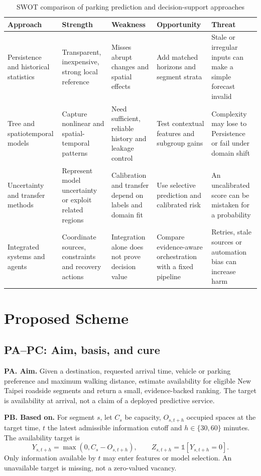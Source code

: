 \documentclass[conference,letterpaper,10pt]{IEEEtran}
\begin{document}
\begin{table}[t]
\caption{SWOT comparison of parking prediction and decision-support approaches}
\label{tab:swot}
\centering
\scriptsize
\renewcommand{\arraystretch}{1.12}
\begin{tabular}{p{}p{}p{}p{}p{}}
\toprule
Approach & Strength & Weakness & Opportunity & Threat \\
\midrule
Persistence and historical statistics & Transparent, inexpensive, strong local reference & Misses abrupt changes and spatial effects & Add matched horizons and segment strata & Stale or irregular inputs can make a simple forecast invalid \\
Tree and spatiotemporal models & Capture nonlinear and spatial-temporal patterns & Need sufficient, reliable history and leakage control & Test contextual features and subgroup gains & Complexity may lose to Persistence or fail under domain shift \\
Uncertainty and transfer methods & Represent model uncertainty or exploit related regions & Calibration and transfer depend on labels and domain fit & Use selective prediction and calibrated risk & An uncalibrated score can be mistaken for a probability \\
Integrated systems and agents & Coordinate sources, constraints and recovery actions & Integration alone does not prove decision value & Compare evidence-aware orchestration with a fixed pipeline & Retries, stale sources or automation bias can increase harm \\
\bottomrule
\end{tabular}
\end{table}

\section{Proposed Scheme}
\subsection{PA--PC: Aim, basis, and cure}
\noindent\textbf{PA. Aim.} Given a destination, requested arrival time, vehicle or parking preference and maximum walking distance, estimate availability for eligible New Taipei roadside segments and return a small, evidence-backed ranking. The target is availability at arrival, not a claim of a deployed predictive service.

\noindent\textbf{PB. Based on.} For segment $s$, let $C_s$ be capacity, $O_{s,t+h}$ occupied spaces at the target time, $t$ the latest admissible information cutoff and $h\in\{30,60\}$ minutes. The availability target is
\begin{equation}
Y_{s,t+h}=\max(0,C_s-O_{s,t+h}),\qquad Z_{s,t+h}=\mathbb{1}[Y_{s,t+h}=0].
\label{eq:target}
\end{equation}
Only information available by $t$ may enter features or model selection. An unavailable target is missing, not a zero-valued vacancy.
\end{document}
